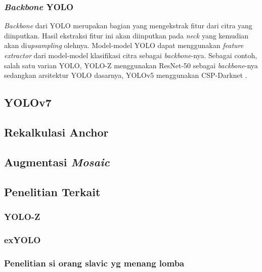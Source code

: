   \subsubsection{\emph{Backbone} YOLO}
    \emph{Backbone} dari YOLO merupakan bagian yang mengekstrak fitur dari citra yang diinputkan.
    Hasil ekstraksi fitur ini akan diinputkan pada \emph{neck} yang kemudian akan di\emph{upsampling} olehnya.
    Model-model YOLO dapat menggunakan \emph{feature extractor} dari model-model klasifikasi citra sebagai \emph{backbone}-nya.
    Sebagai contoh, salah satu varian YOLO, YOLO-Z menggunakan ResNet-50 sebagai \emph{backbone}-nya sedangkan arsitektur YOLO dasarnya, YOLOv5 menggunakan CSP-Darknet \parencite{yoloz}.




\subsection{YOLOv7}
  \lipsum[1]
\subsection{Rekalkulasi Anchor}
  \lipsum[1]
\subsection{Augmentasi \emph{Mosaic}}
  \lipsum[1]

\subsection{Penelitian Terkait}
  \subsubsection{YOLO-Z}
    \lipsum[2]
  \subsubsection{exYOLO}
    \lipsum[2]
  \subsubsection{Penelitian si orang slavic yg menang lomba}
    \lipsum[2]